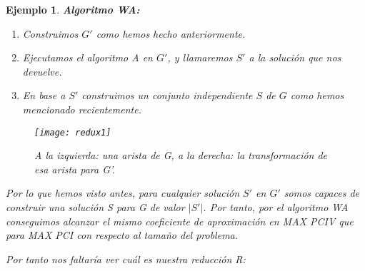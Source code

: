 \documentclass[a4paper,12pt,titlepage]{article}
\newtheorem{eje}{Ejemplo}[section]
\begin{document}
\begin{eje}
\vspace{0,3cm}

\textbf{Algoritmo WA:}

\begin{enumerate}
\item Construimos $G'$ como hemos hecho anteriormente.
\item Ejecutamos el algoritmo A en $G'$, y llamaremos $S'$ a la soluci\'on que nos devuelve.
\item En base a $S'$ construimos un conjunto independiente $S$ de $G$ como hemos mencionado recientemente.
\end{enumerate}

\begin{figure}[h]
\centering
\texttt{[image: redux1]}
\caption{A la izquierda: una arista de G, a la derecha: la transformaci\'on de esa arista para G'.}
\label{redux:fig:2}
\end{figure}

Por lo que hemos visto antes, para cualquier soluci\'on $S'$ en $G'$ somos capaces de construir una soluci\'on S para G de valor $|S'|$. Por tanto, por el algoritmo WA conseguimos alcanzar el mismo coeficiente de aproximaci\'on en MAX PCIV que para MAX PCI con respecto al tamaño del problema.



Por tanto nos faltar\'ia ver cu\'al es nuestra reducci\'on R:


\end{eje}
\end{document}
